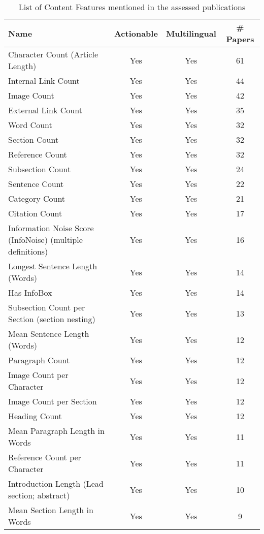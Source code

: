 \begin{table}[htbp]
    \caption{List of Content Features mentioned in the assessed publications}
    \label{tab:feat_Content}
    \centering
    \begin{tabular}{m{} c c c}
        \toprule
        \textbf{Name} & \textbf{Actionable} & \textbf{Multilingual} & \textbf{\# Papers} \\ 
        \midrule
        Character Count (Article Length) & Yes & Yes & 61 \\
        Internal Link Count & Yes & Yes & 44 \\
        Image Count & Yes & Yes & 42 \\
        External Link Count & Yes & Yes & 35 \\
        Word Count & Yes & Yes & 32 \\
        Section Count & Yes & Yes & 32 \\
        Reference Count & Yes & Yes & 32 \\
        Subsection Count & Yes & Yes & 24 \\
        Sentence Count & Yes & Yes & 22 \\
        Category Count & Yes & Yes & 21 \\
        Citation Count & Yes & Yes & 17 \\
        Information Noise Score (InfoNoise) (multiple definitions) & Yes & Yes & 16 \\
        Longest Sentence Length (Words) & Yes & Yes & 14 \\
        Has InfoBox & Yes & Yes & 14 \\
        Subsection Count per Section (section nesting) & Yes & Yes & 13 \\
        Mean Sentence Length (Words) & Yes & Yes & 12 \\
        Paragraph Count & Yes & Yes & 12 \\
        Image Count per Character & Yes & Yes & 12 \\
        Image Count per Section & Yes & Yes & 12 \\
        Heading Count & Yes & Yes & 12 \\
        Mean Paragraph Length in Words & Yes & Yes & 11 \\
        Reference Count per Character & Yes & Yes & 11 \\
        Introduction Length (Lead section; abstract) & Yes & Yes & 10 \\
        Mean Section Length in Words & Yes & Yes & 9 \\

\end{tabular}
\end{table}
